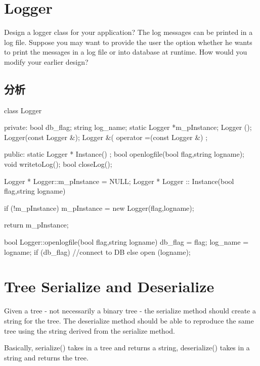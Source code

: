 \section{Logger}
Design a logger class for your application? The log messages can be printed in a log file. 
Suppose you may want to provide the user the option whether he wants to print the messages in a log file or into database at runtime. How would you modify your earlier design?

\subsection{分析}
\begin{Code}
	class Logger {
		private:
		bool db_flag;
		string log_name;
		static Logger *m_pInstance; 
		Logger (){};
		Logger(const Logger &);
		Logger &( operator =(const Logger &) {};
		
		
		public:
		static Logger * Instance() {};
		bool openlogfile(bool flag,string logname);
		void writetoLog();      
		bool closeLog();
		
	}
	
	Logger * Logger::m_pInstance = NULL;
	Logger * Logger :: Instance(bool flag,string logname) {
		if (!m_pInstance) 
		m_pInstance = new Logger(flag,logname);
		
		return m_pInstance;
	}
	
	bool Logger::openlogfile(bool flag,string logname) {
		db_flag = flag;
		log_name = logname;
		if (db_flag){
			//connect to DB
		} else
		open (logname);
	}
\end{Code}

\section{Tree Serialize and Deserialize}
Given a tree - not necessarily a binary tree - the serialize method should create a string for the tree. The deserialize method should be able to reproduce the same tree using the 
string derived from the serialize method. 

Basically, serialize() takes in a tree and returns a string, deserialize() takes in a string and returns the tree.

